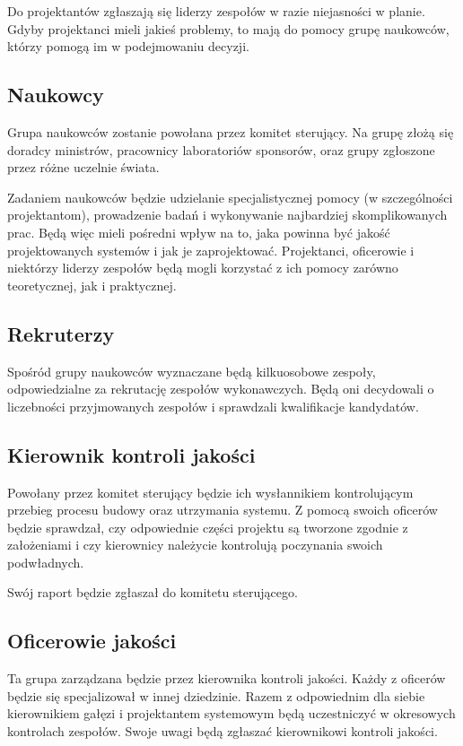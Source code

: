 Do projektantów zgłaszają się liderzy zespołów w razie niejasności w planie.
Gdyby projektanci mieli jakieś problemy, to mają do pomocy grupę naukowców, którzy pomogą im w podejmowaniu decyzji.

\subsection{Naukowcy}
Grupa naukowców zostanie powołana przez komitet sterujący.
Na grupę złożą się doradcy ministrów, pracownicy laboratoriów sponsorów, oraz grupy zgłoszone przez różne uczelnie świata.

Zadaniem naukowców będzie udzielanie specjalistycznej pomocy (w szczególności projektantom), prowadzenie badań i wykonywanie najbardziej skomplikowanych prac. 
Będą więc mieli pośredni wpływ na to, jaka powinna być jakość projektowanych systemów i jak je zaprojektować.
Projektanci, oficerowie i niektórzy liderzy zespołów będą mogli korzystać z ich pomocy zarówno teoretycznej, jak i praktycznej.

\subsection{Rekruterzy}
Spośród grupy naukowców wyznaczane będą kilkuosobowe zespoły, odpowiedzialne za rekrutację zespołów wykonawczych. Będą oni decydowali o liczebności przyjmowanych zespołów i sprawdzali kwalifikacje kandydatów.

\subsection{Kierownik kontroli jakości}
Powołany przez komitet sterujący będzie ich wysłannikiem kontrolującym przebieg procesu budowy oraz utrzymania systemu.
Z pomocą swoich oficerów będzie sprawdzał, czy odpowiednie części projektu są tworzone zgodnie z założeniami i czy kierownicy należycie kontrolują poczynania swoich podwładnych.

Swój raport będzie zgłaszał do komitetu sterującego.

\subsection{Oficerowie jakości}
Ta grupa zarządzana będzie przez kierownika kontroli jakości.
Każdy z oficerów będzie się specjalizował w innej dziedzinie.
Razem z odpowiednim dla siebie kierownikiem gałęzi i projektantem systemowym będą uczestniczyć w okresowych kontrolach zespołów.
Swoje uwagi będą zgłaszać kierownikowi kontroli jakości.

